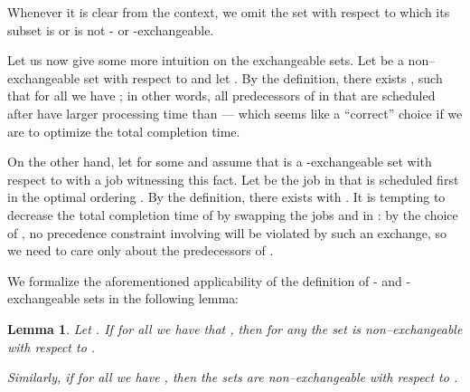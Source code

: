 \documentclass{article}
\newtheorem{lemma}[theorem]{Lemma}
\theoremstyle{definition}
\begin{document}
Whenever it is clear from the context, we omit the set  with respect to which its subset is
or is not - or -exchangeable.

Let us now give some more intuition on the exchangeable sets.
Let  be a non--exchangeable set with respect to  and let .
By the definition, there exists , such that for all 
we have ; in other words, all predecessors of  in  that are scheduled after 
have larger processing time than  --- which seems like a ``correct'' choice if we are to optimize the total completion time.

On the other hand, let  for some  and
assume that  is a -exchangeable set with respect to  with a job  witnessing this fact.
Let  be the job in  that is scheduled first in the optimal ordering .
By the definition, there exists  with .
It is tempting to decrease the total completion time of  by swapping the jobs  and  in : by the choice of , no precedence constraint
involving  will be violated by such an exchange, so we need to care only about the predecessors of .

We formalize the aforementioned applicability of the definition of - and -exchangeable sets in the following lemma:
\begin{lemma}\label{lem:exchange}
Let .
If for all  we have that , then for any  the set 
is non--exchangeable with respect to .

Similarly, if for all  we have ,
then the sets  are non--exchangeable with respect to .
\end{lemma}
\end{document}
